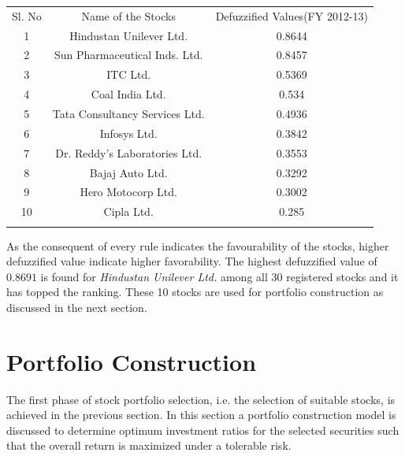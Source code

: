 \documentclass{ws-ijufks}
\begin{document}
\begin{table}[h]
	\label{tab:Top_Stocks}
	{\begin{tabular}{@{}ccc@{}} 
			\toprule
			 Sl. No &  Name of the Stocks & Defuzzified Values(FY 2012-13)\\
			\colrule
			{1} & {Hindustan Unilever Ltd.} & {0.8644}\\
			
			{2} & {Sun Pharmaceutical Inds. Ltd.} & {0.8457}\\
		
			{3} & {ITC Ltd.} & {0.5369}\\
			
			{4} & {Coal India Ltd.} & {0.534}\\
			
			{5} & {Tata Consultancy Services Ltd.} & {0.4936}\\
			
			{6} & {Infosys Ltd.} & {0.3842}\\
			
			{7} & {Dr. Reddy's Laboratories Ltd.} & {0.3553}\\
			
			{8} & {Bajaj Auto Ltd.} & {0.3292}\\
			
			{9} & {Hero Motocorp Ltd.} & {0.3002}\\
			
			{10} & {Cipla Ltd.} & {0.285}\\
			
			\botrule
		\end{tabular}}
	\end{table}

As the consequent of every rule indicates the favourability of the stocks, higher defuzzified value indicate higher 
favorability. The highest defuzzified value of $0.8691$ is found for \emph{Hindustan Unilever Ltd.} among all 30 
registered stocks and it has topped the ranking. These 10 stocks are used for portfolio construction as discussed in 
the next section.

\section{Portfolio Construction}
The first phase of stock portfolio selection, i.e. the selection of suitable stocks, is 
achieved in the previous section. In this section a portfolio construction model is 
discussed to determine optimum investment ratios for the selected securities such that 
the overall return is maximized under a tolerable risk. 
\end{document}

